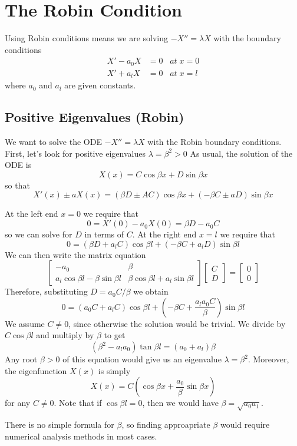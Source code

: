 \section{The Robin Condition}


Using Robin conditions means we are solving $-X'' = \lambda X$ with the boundary conditions \begin{align}
    X' -a_0X &= 0\;\;\;at\;x=0 \\
    X'+a_lX &= 0 \;\;\;at\;x=l
\end{align}
where $a_0$ and $a_l$ are given constants.

\subsection{Positive Eigenvalues (Robin)}

We want to solve the ODE $-X'' = \lambda X$ with the Robin boundary conditions. First, let's look for positive eigenvalues $\lambda = \beta^2 > 0$ As usual, the solution of the ODE is $$X(x) = C\cos\beta x+D\sin\beta x$$ so that $$X'(x)\pm aX(x) = (\beta D\pm AC)\cos\beta x+(-\beta C\pm aD)\sin\beta x$$

At the left end $x = 0$ we require that \begin{equation*}
    0 = X'(0) - a_0X(0) = \beta D-a_0C
\end{equation*}
so we can solve for $D$ in terms of $C$. At the right end $x = l$ we require that \begin{equation*}
    0 = (\beta D+a_lC)\cos\beta l + (-\beta C+a_lD)\sin\beta l
\end{equation*}
We can then write the matrix equation \begin{equation*}
    \begin{bmatrix} -a_0 & \beta \\ a_l\cos\beta l - \beta\sin\beta l & \beta\cos\beta l + a_l\sin\beta l \end{bmatrix}\begin{bmatrix}C \\ D \end{bmatrix} = \begin{bmatrix} 0 \\ 0 \end{bmatrix}
\end{equation*}
Therefore, substituting $D = a_0C/\beta$ we obtain \begin{equation*}
    0 = (a_0C+a_lC)\cos\beta l+\left(-\beta C+\frac{a_la_0C}{\beta}\right)\sin\beta l
\end{equation*}
We assume $C \neq 0$, since otherwise the solution would be trivial. We divide by $C\cos\beta l$ and multiply by $\beta$ to get \begin{equation*}
    (\beta^2-a_la_0)\tan\beta l = (a_0+a_l)\beta
\end{equation*}
Any root $\beta > 0$ of this equation would give us an eigenvalue $\lambda = \beta^2$. Moreover, the eigenfunction $X(x)$ is simply \begin{equation*}
    X(x) = C\left(\cos\beta x+\frac{a_0}{\beta}\sin\beta x\right)
\end{equation*}
for any $C \neq 0$. Note that if $\cos\beta l = 0$, then we would have $\beta = \sqrt{a_0a_1}$.

There is no simple formula for $\beta$, so finding approapriate $\beta$ would require numerical analysis methods in most cases.



